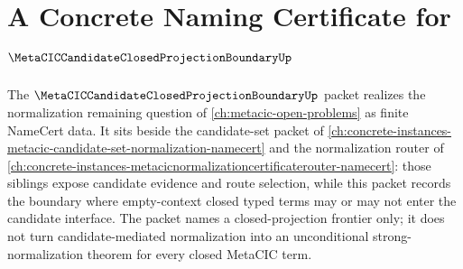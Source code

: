 \chapter{A Concrete Naming Certificate for $\MetaCICCandidateClosedProjectionBoundaryUp$}
\label{ch:concrete-instances-metacic-candidate-closed-projection-boundary-namecert}

The $\MetaCICCandidateClosedProjectionBoundaryUp$ packet realizes the normalization remaining question of \autoref{ch:metacic-open-problems} as finite NameCert data. It sits beside the candidate-set packet of \autoref{ch:concrete-instances-metacic-candidate-set-normalization-namecert} and the normalization router of \autoref{ch:concrete-instances-metacicnormalizationcertificaterouter-namecert}: those siblings expose candidate evidence and route selection, while this packet records the boundary where empty-context closed typed terms may or may not enter the candidate interface. The packet names a closed-projection frontier only; it does not turn candidate-mediated normalization into an unconditional strong-normalization theorem for every closed MetaCIC term.

